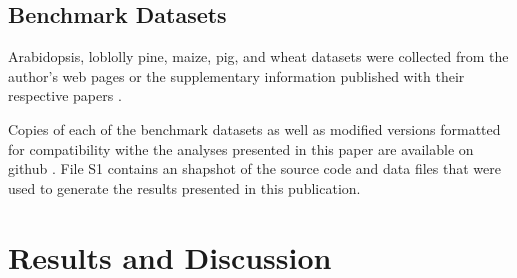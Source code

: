 \documentclass[9pt,twocolumn,twoside]{g3_article/gsag3jnl}
\begin{document}
\subsection*{Benchmark Datasets}

Arabidopsis, loblolly pine, maize, pig, and wheat datasets were collected from the author's web pages
or the supplementary information published with their respective papers \citep{loudet2002, resende2012, crossa2010, cleveland2012, thavamanikumar2015}.


Copies of each of the benchmark datasets as well as modified versions formatted for compatibility withe the analyses
presented in this paper are available on github \citep{mcdowell2016}. File S1 contains an shapshot of the 
source code and data files that were used to generate the results presented in this publication.

%

\section*{Results and Discussion}
\end{document}
